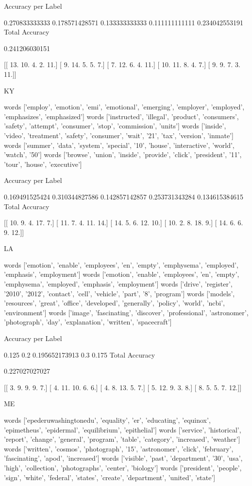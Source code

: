 \documentclass[11pt]{article}
\begin{document}
\begin{verbatium}
Accuracy per Label

0.270833333333
0.178571428571
0.133333333333
0.111111111111
0.234042553191
Total Accuracy

0.241206030151


[[ 13.  10.   4.   2.  11.]
 [  9.  14.   5.   5.   7.]
 [  7.  12.   6.   4.  11.]
 [ 10.  11.   8.   4.   7.]
 [  9.   9.   7.   3.  11.]]


KY


words
['employ', 'emotion', 'emi', 'emotional', 'emerging', 'employer', 'employed', 'emphasizes', 'emphasized']
words
['instructed', 'illegal', 'product', 'consumers', 'safety', 'attempt', 'consumer', 'stop', 'commission', 'units']
words
['inside', 'video', 'treatment', 'safety', 'consumer', 'wait', '21', 'tax', 'version', 'inmate']
words
['summer', 'data', 'system', 'special', '10', 'house', 'interactive', 'world', 'watch', '50']
words
['browse', 'union', 'inside', 'provide', 'click', 'president', '11', 'tour', 'house', 'executive']

Accuracy per Label

0.169491525424
0.310344827586
0.142857142857
0.253731343284
0.134615384615
Total Accuracy



[[ 10.   9.   4.  17.   7.]
 [ 11.   7.   4.  11.  14.]
 [ 14.   5.   6.  12.  10.]
 [ 10.   2.   8.  18.   9.]
 [ 14.   6.   6.   9.  12.]]


LA


words
['emotion', 'enable', 'employees', 'en', 'empty', 'emphysema', 'employed', 'emphasis', 'employment']
words
['emotion', 'enable', 'employees', 'en', 'empty', 'emphysema', 'employed', 'emphasis', 'employment']
words
['drive', 'register', '2010', '2012', 'contact', 'cell', 'vehicle', 'part', '8', 'program']
words
['models', 'resources', 'great', 'office', 'developed', 'generally', 'policy', 'world', 'ncbi', 'environment']
words
['image', 'fascinating', 'discover', 'professional', 'astronomer', 'photograph', 'day', 'explanation', 'written', 'spacecraft']

Accuracy per Label

0.125
0.2
0.195652173913
0.3
0.175
Total Accuracy

0.227027027027


[[  3.   9.   9.   9.   7.]
 [  4.  11.  10.   6.   6.]
 [  4.   8.  13.   5.   7.]
 [  5.  12.   9.   3.   8.]
 [  8.   5.   5.   7.  12.]]


ME


words
['epederuwashingtonedu', 'equality', 'er', 'educating', 'equinox', 'epimetheus', 'epidermal', 'equilibrium', 'epithelial']
words
['service', 'historical', 'report', 'change', 'general', 'program', 'table', 'category', 'increased', 'weather']
words
['written', 'cosmos', 'photograph', '15', 'astronomer', 'click', 'february', 'fascinating', 'apod', 'increased']
words
['visible', 'past', 'department', '30', 'usa', 'high', 'collection', 'photographs', 'center', 'biology']
words
['president', 'people', 'sign', 'white', 'federal', 'states', 'create', 'department', 'united', 'state']


\end{verbatium}
\end{document}
